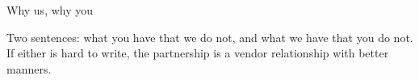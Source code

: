 \begin{frame}{Why us, why you}
  \begin{glass}
  Two sentences: what you have that we do not, and what we have that you do not. If either
  is hard to write, the partnership is a vendor relationship with better manners.
  \end{glass}
\end{frame}
